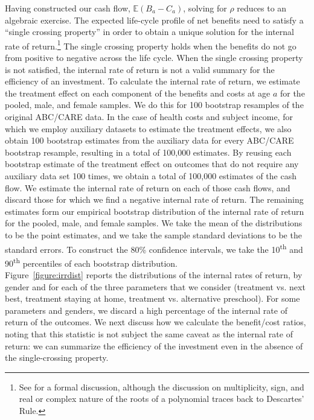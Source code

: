 \noindent Having constructed our cash flow, $\mathbb{E} (B_a - C_a)$, solving for $\rho$ reduces to an algebraic exercise. The expected life-cycle profile of net benefits need to satisfy a ``single crossing property'' in order to obtain a unique solution for the internal rate of return.\footnote{See \citet{Arrow-Levhari_1969_EJ} for a formal discussion, although the discussion on multiplicity, sign, and real or complex nature of the roots of a polynomial traces back to Descartes' Rule.} The single crossing property holds when the benefits do not go from positive to negative across the life cycle. When the single crossing property is not satisfied, the internal rate of return is not a valid summary for the efficiency of an investment. To calculate the internal rate of return, we estimate the treatment effect on each component of the benefits and costs at age $a$ for the pooled, male, and female samples. We do this for 100 bootstrap resamples of the original ABC/CARE data. In the case of health costs and subject income, for which we employ auxiliary datasets to estimate the treatment effects, we also obtain 100 bootstrap estimates from the auxiliary data for every ABC/CARE bootstrap resample, resulting in a total of 100,000 estimates. By reusing each bootstrap estimate of the treatment effect on outcomes that do not require any auxiliary data set 100 times, we obtain a total of 100,000 estimates of the cash flow. We estimate the internal rate of return on each of those cash flows, and discard those for which we find a negative internal rate of return. The remaining estimates form our empirical bootstrap distribution of the internal rate of return for the pooled, male, and female samples. We take the mean of the distributions to be the point estimates, and we take the sample standard deviations to be the standard errors. To construct the 80\% confidence intervals, we take the 10\textsuperscript{th} and 90\textsuperscript{th} percentiles of each bootstrap distribution.\\

\noindent Figure~\ref{figure:irrdist} reports the distributions of the internal rates of return, by gender and for each of the three parameters that we consider (treatment vs. next best, treatment staying at home, treatment vs. alternative preschool). For some parameters and genders, we discard a high percentage of the internal rate of return of the outcomes. We next discuss how we calculate the benefit/cost ratios, noting that this statistic is not subject the same caveat as the internal rate of return: we can summarize the efficiency of the investment even in the absence of the single-crossing property.

